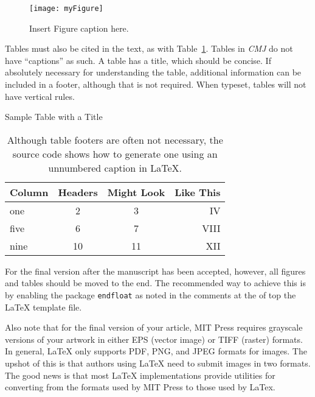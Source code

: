 \documentclass[letterpaper, 12pt]{article}
\begin{document}
\begin{figure}[]
\begin{center}
\texttt{[image: myFigure]}
\caption{Insert Figure caption here.}
\label{fig:myFigure}
\end{center}
\end{figure}

Tables must also be cited in the text, as with Table~\ref{tab:myTable}. Tables in \emph{CMJ} do not have ``captions'' as such. A table has a title, which should be concise. If absolutely necessary for understanding the table, additional information can be included in a footer, although that is not required. When typeset, tables will not have vertical rules.

\begin{table}[]
\caption{Sample Table with a Title}
\centering
\begin{tabular}{lccr}
  \hline
  \textbf{Column} & \textbf{Headers} & \textbf{Might Look} & \textbf{Like This}  \\
  \hline
  one & 2 & 3 & IV \\
  five & 6 & 7 & VIII \\
  nine & 10 & 11 & XII \\
   \hline
\end{tabular}
\caption*{\textnormal{{\small Although table footers are often not necessary, the source code shows how to generate one using an unnumbered caption in LaTeX.}}}
\label{tab:myTable}
\end{table}%


For the final version after the manuscript has been accepted, however, all figures and tables should be moved to the end.
The recommended way to achieve this is by enabling the package {\tt endfloat} as noted in the comments at the of top the LaTeX template file.

Also note that for the final version of your article, MIT Press requires grayscale versions of your artwork in either EPS (vector image) or TIFF (raster) formats.
In general, LaTeX only supports PDF, PNG, and JPEG formats for images.
The upshot of this is that authors using LaTeX need to submit images in two formats.
The good news is that most LaTeX implementations provide utilities for converting from the formats used by MIT Press to those used by LaTex.
\end{document}
